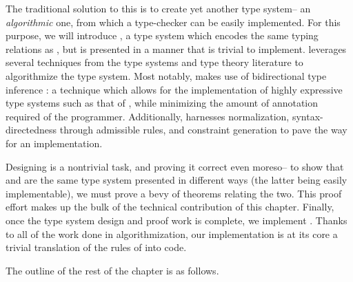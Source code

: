 The traditional solution to this is to create yet another type system-- an \textit{algorithmic} one, from which a type-checker can be easily implemented. For this purpose, we will introduce \bilambdaamor, a type system which encodes the same typing relations as \dlambdaamor, but is presented in a manner that is trivial to implement. \bilambdaamor leverages several techniques from the type systems and type theory literature to algorithmize the \dlambdaamor type system. Most notably, \bilambdaamor makes use of bidirectional type inference \cite{pierce-and-turner:lti}: a technique which allows for the implementation of highly expressive type systems such as that of \dlambdaamor, while minimizing the amount of annotation required of the programmer. Additionally, \bilambdaamor harnesses normalization, syntax-directedness through admissible rules, and constraint generation to pave the way for an implementation.

Designing \bilambdaamor is a nontrivial task, and proving it correct even moreso-- to show that \dlambdaamor and \bilambdaamor are the same type system presented in different ways (the latter being easily implementable), we must prove a bevy of theorems relating the two. This proof effort makes up the bulk of the technical contribution of this chapter. Finally, once the type system design and proof work is complete, we implement \bilambdaamor. Thanks to all of the work done in algorithmization, our implementation is at its core a trivial translation of the rules of \bilambdaamor into code.

The outline of the rest of the chapter is as follows.

